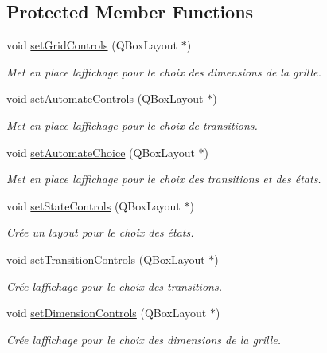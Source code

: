\subsection*{Protected Member Functions}
\begin{DoxyCompactItemize}
\item 
void \mbox{\hyperlink{class_simulator_interface_afd8d818dd52b9a64ec474129b356ac7c}{set\+Grid\+Controls}} (Q\+Box\+Layout $\ast$)
\begin{DoxyCompactList}\small\item\em Met en place l\textquotesingle{}affichage pour le choix des dimensions de la grille. \end{DoxyCompactList}\item 
void \mbox{\hyperlink{class_simulator_interface_a4e0f810b745376a43fcdb7f97b870592}{set\+Automate\+Controls}} (Q\+Box\+Layout $\ast$)
\begin{DoxyCompactList}\small\item\em Met en place l\textquotesingle{}affichage pour le choix de transitions. \end{DoxyCompactList}\item 
void \mbox{\hyperlink{class_simulator_interface_af9126d9fd35496a369f476974db559c5}{set\+Automate\+Choice}} (Q\+Box\+Layout $\ast$)
\begin{DoxyCompactList}\small\item\em Met en place l\textquotesingle{}affichage pour le choix des transitions et des états. \end{DoxyCompactList}\item 
void \mbox{\hyperlink{class_simulator_interface_a0319645039e095dc8eb95bdf4cadb10a}{set\+State\+Controls}} (Q\+Box\+Layout $\ast$)
\begin{DoxyCompactList}\small\item\em Crée un layout pour le choix des états. \end{DoxyCompactList}\item 
void \mbox{\hyperlink{class_simulator_interface_a320a338b1d96a6bf8e19a454d520048d}{set\+Transition\+Controls}} (Q\+Box\+Layout $\ast$)
\begin{DoxyCompactList}\small\item\em Crée l\textquotesingle{}affichage pour le choix des transitions. \end{DoxyCompactList}\item 
void \mbox{\hyperlink{class_simulator_interface_ac14b36fcdfda65e0498c629ab9495b0d}{set\+Dimension\+Controls}} (Q\+Box\+Layout $\ast$)
\begin{DoxyCompactList}\small\item\em Crée l\textquotesingle{}affichage pour le choix des dimensions de la grille. \end{DoxyCompactList}\item 

\end{DoxyCompactItemize}
